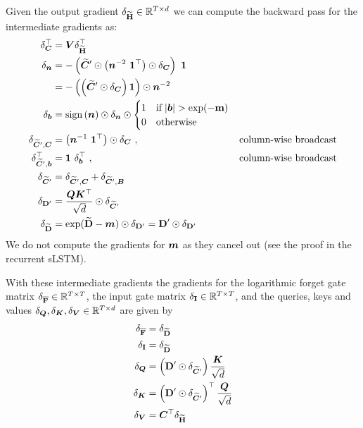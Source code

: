 \documentclass[dvipsnames]{article}
\begin{document}
\begin{appendix}
Given the output gradient $\delta_{\widetilde{\bm{\mathrm{H}}}} \in \mathbb{R}^{T \times d}$ we can compute the backward pass for the intermediate gradients as:
\begin{alignat}{2}
    \delta_{\BC}^\top &= \BV \delta_{\widetilde{\bm{\rH}}}^\top \\
    \delta_{\Bn} &=-\left(\widetilde{\BC}' \odot \left(\Bn^{-2} \ \BOn^\top \right)\odot \delta_{\BC} \right) \ \BOn \\
                 &= - \left( \left( \widetilde{\BC}' \odot \delta_{\BC} \right) \BOn \right) \odot \Bn^{-2} \\
    \delta_{\Bb} &= \sign \left( \Bn \right) \odot \delta_{\Bn} \odot \begin{cases}
        1 & \text{if} \; |\Bb| > \exp(-\bm{\Rm}) \\
        0 & \text{otherwise}
    \end{cases} \\
    \delta_{\widetilde{\BC}', \BC} &= \left(\Bn^{-1} \ \BOn^\top \right) \odot \delta_{\BC} \ , \quad &\text{column-wise broadcast} \\
    \delta_{\widetilde{\BC}', \Bb}^\top &= \BOn \ \delta_{\Bb}^\top \ , \quad &\text{column-wise broadcast} \\
    \delta_{\widetilde{\BC}'} &= \delta_{\widetilde{\BC}', \BC} + \delta_{\widetilde{\BC}', \BB} \\
    \delta_{\bm{\rD}'} &= \frac{\BQ \BK^\top}{\sqrt{d}} \odot \delta_{\widetilde{\BC}'} \\
    \delta_{\widetilde{\bm{\rD}}} &= \exp(\widetilde{\bm{\rD}} - \Bm) \odot \delta_{\bm{\rD}'} = \bm{\rD}' \odot \delta_{\bm{\rD}'}
\end{alignat}
We do not compute the gradients for $\bm{m}$ as they cancel out (see the proof in the recurrent sLSTM).

With these intermediate gradients the gradients for the logarithmic forget gate matrix $\delta_{\overline{\bm{\mathrm{F}}}} \in \mathbb{R}^{T \times T}$, the input gate matrix $\delta_{\bm{\mathrm{I}}} \in \mathbb{R}^{T \times T}$, 
and the queries, keys and values $\delta_{\bm{Q}}, \delta_{\bm{K}}, \delta_{\bm{V}} \in \mathbb{R}^{T \times d}$ are given by
\begin{alignat}{1}
    \delta_{\overline{\bm{\mathrm{F}}}} &= \delta_{\widetilde{\bm{\mathrm{D}}}} \\
    \delta_{\bm{\mathrm{I}}} &= \delta_{\widetilde{\bm{\mathrm{D}}}} \\
    \delta_{\bm{Q}} &= \left( \bm{\mathrm{D}}' \odot \delta_{\widetilde{\bm{C}}'} \right) \frac{\bm{K}}{\sqrt{d}} \\ 
    \delta_{\bm{K}} &= \left( \bm{\mathrm{D}}' \odot \delta_{\widetilde{\bm{C}}'} \right)^\top \frac{\bm{Q}}{\sqrt{d}} \\
    \delta_{\bm{V}} &= \bm{C}^\top \delta_{\widetilde{\bm{\mathrm{H}}}}
\end{alignat}


\end{appendix}
\end{document}
